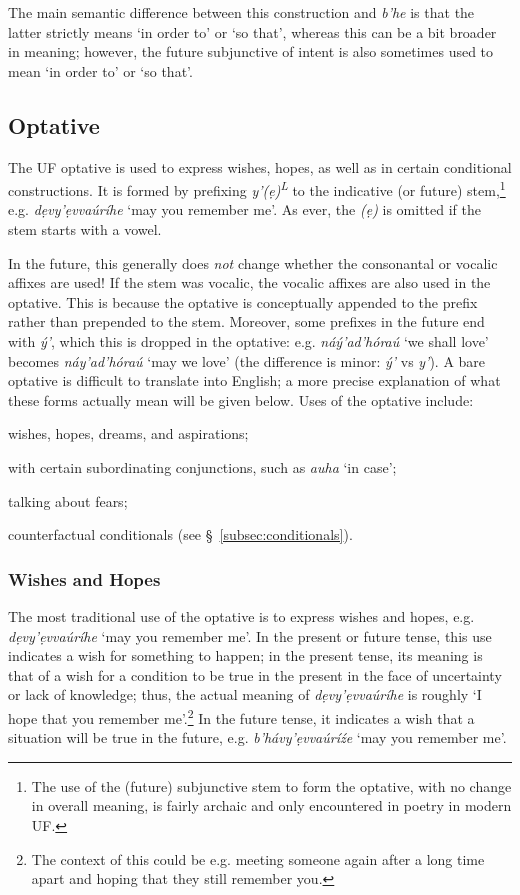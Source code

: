 \documentclass[a4paper, 12pt, twoside, final]{article}
\newlength{\EnumItemSep} \EnumItemSep-3pt
\newenvironment { enum } [1] [0] {
    \vspace { -.5em }
    \settowidth \leftmargini { 99.\hskip\labelsep }
    \begin { enumerate }
    \setcounter { enumi } { #1 }
    \itemsep \EnumItemSep
} {
    \end { enumerate }
    \vspace { -.5em }
}
\def \L {\textsuperscript{L}}
\let \w \textit
\begin{document}
The main semantic difference between this construction and \w{b’he} is that the latter strictly means ‘in order to’ or ‘so that’,
whereas this can be a bit broader in meaning; however, the future subjunctive of intent is also sometimes used to mean ‘in order to’
or ‘so that’.

\subsection{Optative}\label{subsec:optative}
The UF optative is used to express wishes, hopes, as well as in certain conditional constructions. It is formed
by prefixing \w{y’(ẹ)\L} to the indicative (or future) stem,\footnote{The use of the (future) subjunctive stem to form the optative, with
no change in overall meaning, is fairly archaic and only encountered in poetry in modern UF.} e.g. \w{dẹvy’ẹvvaúríhe} ‘may
you remember me’. As ever, the \w{(ẹ)} is omitted if the stem starts with a vowel.

In the future, this generally does \textit{not} change whether the consonantal or vocalic affixes are used! If the stem was
vocalic, the vocalic affixes are also used in the optative. This is because the optative is conceptually appended to the prefix rather than
prepended to the stem. Moreover, some prefixes in the future end with
\w{ý’}, which this is dropped in the optative: e.g. \w{náý’ad’hóraú} ‘we shall love’ becomes \w{náy’ad’hóraú} ‘may we love’ (the
difference is minor: \w{ý’} vs \w{y’}). A bare optative is difficult to translate into English; a more precise explanation of what
these forms actually mean will be given below. Uses of the optative include:

\begin{enum}
\item wishes, hopes, dreams, and aspirations;
\item with certain subordinating conjunctions, such as \w{auha} ‘in case’;
\item talking about fears;
\item counterfactual conditionals (see §~\ref{subsec:conditionals}).
\end{enum}

\subsubsection{Wishes and Hopes}
The most traditional use of the optative is to express wishes and hopes, e.g. \w{dẹvy’ẹvvaúríhe} ‘may you remember me’. In
the present or future tense, this use indicates a wish for something to happen; in the present tense, its meaning is
that of a wish for a condition to be true in the present in the face of uncertainty or lack of knowledge; thus, the
actual meaning of \w{dẹvy’ẹvvaúríhe} is roughly ‘I hope that you remember me’.\footnote{The context of this could be e.g.
meeting someone again after a long time apart and hoping that they still remember you.} In the future tense, it indicates a wish
that a situation will be true in the future, e.g. \w{b’hávy’ẹvvaúríźe} ‘may you remember me’.
\end{document}
